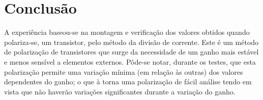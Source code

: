 \chapter{Conclus\~{a}o}
A experiência baseou-se na montagem e verificação dos valores obtidos quando polariza-se, um transistor, pelo método da divisão de corrente. Este é um método de polarização de transistores que surge da necessidade de um ganho mais estável e menos sensível a elementos externos.
Pôde-se notar, durante os testes, que esta polarização permite uma variação mínima (em relação às outras) dos valores dependentes do ganho; o que à torna uma polarização de fácil análise tendo em vista que não haverão variações significantes durante a variação do ganho.

